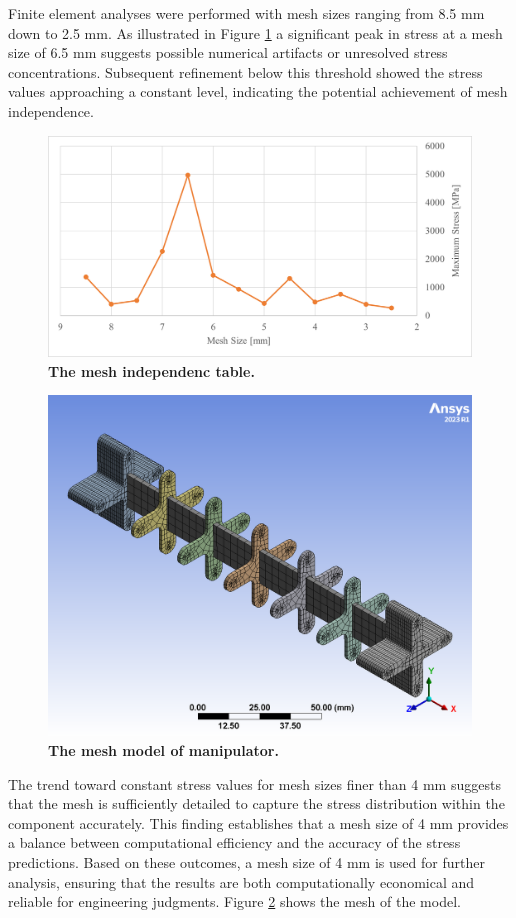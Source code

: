 Finite element analyses were performed with mesh sizes ranging from 8.5 mm down to 2.5 mm. As illustrated in 
Figure \ref{fig:mesh_indep} a significant peak in stress at a mesh size of 6.5 mm suggests possible numerical artifacts or 
unresolved stress concentrations. Subsequent refinement below this threshold showed the stress values approaching 
a constant level, indicating the potential achievement of mesh independence.
\begin{figure}[H] %
    \centering
    \captionsetup{labelsep=colon}
    \includegraphics[width=.85\textwidth]{Image/Design/mesh_independence.png} 
    \caption[The mesh independence table]
    {\centering \textbf{The mesh independenc table.}}
    \label{fig:mesh_indep}
\end{figure}
\begin{figure}[H] %
    \centering
    \captionsetup{labelsep=colon}
    \includegraphics[width=.85\textwidth]{Image/Design/model_mesh.png} 
    \caption[The mesh model of manipulator]
    {\centering \textbf{The mesh model of manipulator.}}
    \label{fig:mesh_model}
\end{figure}
\noindent The trend toward constant stress values for mesh sizes finer than 4 mm suggests that the mesh is sufficiently 
detailed to capture the stress distribution within the component accurately. This finding establishes that a 
mesh size of 4 mm provides a balance between computational efficiency and the accuracy of the stress predictions. 
Based on these outcomes, a mesh size of 4 mm is used for further analysis, ensuring that the results are both 
computationally economical and reliable for engineering judgments. Figure \ref{fig:mesh_model} shows the mesh 
of the model.

